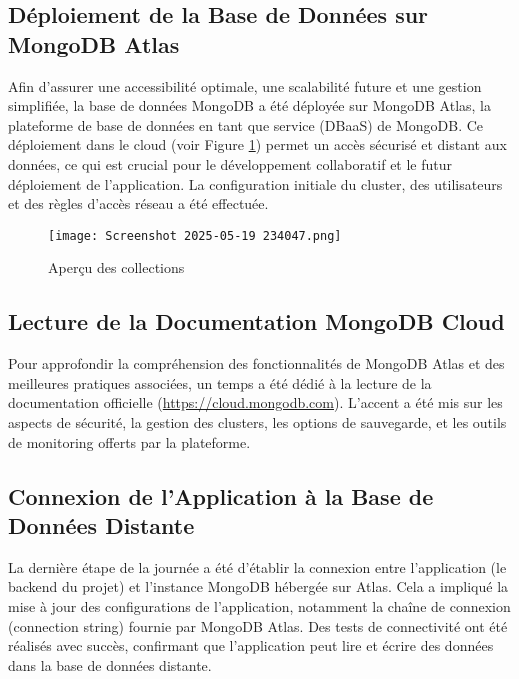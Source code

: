\documentclass[12pt, a4paper]{article}
\begin{document}
\subsection{Déploiement de la Base de Données sur MongoDB Atlas}
Afin d'assurer une accessibilité optimale, une scalabilité future et une gestion simplifiée, la base de données MongoDB a été déployée sur MongoDB Atlas, la plateforme de base de données en tant que service (DBaaS) de MongoDB. Ce déploiement dans le cloud (voir Figure \ref{fig:mongodb_atlas_collections}) permet un accès sécurisé et distant aux données, ce qui est crucial pour le développement collaboratif et le futur déploiement de l'application. La configuration initiale du cluster, des utilisateurs et des règles d'accès réseau a été effectuée.

\begin{figure}[htbp]
  \centering
  \texttt{[image: Screenshot 2025-05-19 234047.png]} %
  \caption{Aperçu des collections}
  \label{fig:mongodb_atlas_collections}
\end{figure}

\subsection{Lecture de la Documentation MongoDB Cloud}
Pour approfondir la compréhension des fonctionnalités de MongoDB Atlas et des meilleures pratiques associées, un temps a été dédié à la lecture de la documentation officielle (\url{https://cloud.mongodb.com}). L'accent a été mis sur les aspects de sécurité, la gestion des clusters, les options de sauvegarde, et les outils de monitoring offerts par la plateforme.

\subsection{Connexion de l'Application à la Base de Données Distante}
La dernière étape de la journée a été d'établir la connexion entre l'application (le backend du projet) et l'instance MongoDB hébergée sur Atlas. Cela a impliqué la mise à jour des configurations de l'application, notamment la chaîne de connexion (connection string) fournie par MongoDB Atlas. Des tests de connectivité ont été réalisés avec succès, confirmant que l'application peut lire et écrire des données dans la base de données distante.
\end{document}

